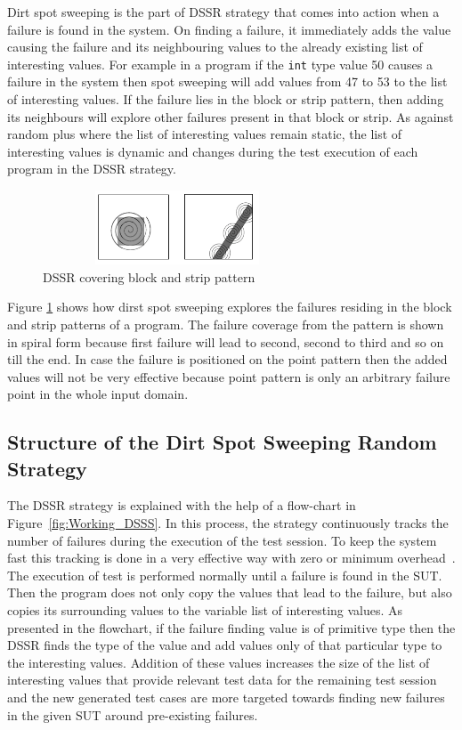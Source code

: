 \documentclass{acm_proc_article-sp}
\begin{document}
Dirt spot sweeping is the part of DSSR strategy that comes into action when a failure is found in the system. On finding a failure, it immediately adds the value causing the failure and its neighbouring values to the already existing list of interesting values. For example in a program if the \verb+int+ type value 50 causes a failure in the system then spot sweeping will add values from 47 to 53 to the list of interesting values. If the failure lies in the block or strip pattern, then adding its neighbours will explore other failures present in that block or strip. As against random plus where the list of interesting values remain static, the list of interesting values is dynamic and changes during the test execution of each program in the DSSR strategy.

\begin{figure}[ht]
\centering
\includegraphics[width=8cm,height=2.2cm]{block2.png}
\caption{DSSR covering block and strip pattern}
\label{fig:block2}
\end{figure}

Figure \ref{fig:block2} shows how dirst spot sweeping explores the failures residing in the block and strip patterns of a program. The failure coverage from the pattern is shown in spiral form because first failure will lead to second, second to third and so on till the end. In case the failure is positioned on the point pattern then the added values will not be very effective because point pattern is only an arbitrary failure point in the whole input domain.

\subsection{Structure of the Dirt Spot Sweeping Random Strategy}

The DSSR strategy is explained with the help of a flow-chart in Figure~\ref{fig:Working_DSSS}. In this process, the strategy continuously tracks the number of failures during the execution of the test session. To keep the system fast this tracking is done in a very effective way with zero or minimum overhead~\cite{Leitner2009}. The execution of test is performed normally until a failure is found in the SUT. Then the program does not only copy the values that lead to the failure, but also copies its surrounding values to the variable list of interesting values. As presented in the flowchart, if the failure finding value is of primitive type then the DSSR finds the type of the value and add values only of that particular type to the interesting values. Addition of these values increases the size of the list of interesting values that provide relevant test data for the remaining test session and the new generated test cases are more targeted towards finding new failures in the given SUT around pre-existing failures.
\end{document}
